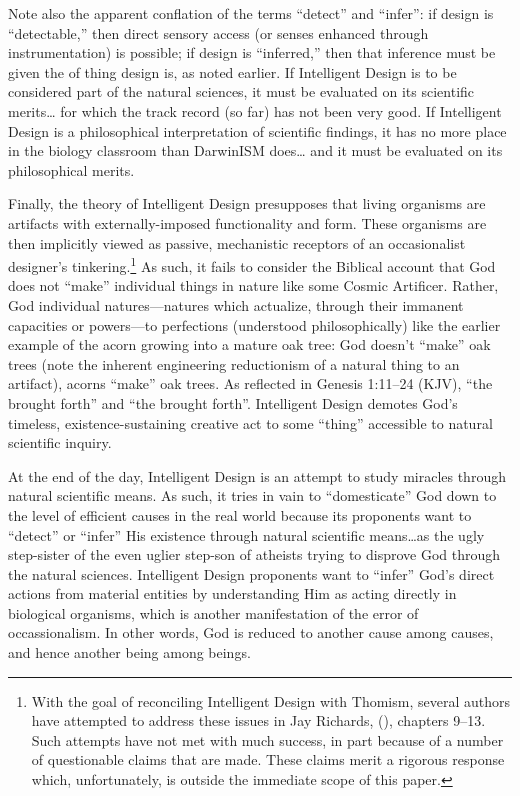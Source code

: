 Note also the apparent conflation of the terms ``detect'' and ``infer'': if design is ``detectable,'' then direct sensory access (or senses enhanced through instrumentation) is possible; if design is ``inferred,'' then that inference must be  given the  of thing design is, as noted earlier. If Intelligent Design is to be considered part of the natural sciences, it must be evaluated on its scientific merits\ldots{} for which the track record (so far) has not been very good. If Intelligent Design is a philosophical interpretation of scientific findings, it has no more place in the biology classroom than DarwinISM does\ldots{} and it must be evaluated on its philosophical merits.

Finally, the theory of Intelligent Design presupposes that living organisms are artifacts with externally-imposed functionality and form. These organisms are then implicitly viewed as passive, mechanistic receptors of an occasionalist designer's tinkering.\footnote{With the goal of reconciling Intelligent Design with Thomism, several authors have attempted to address these issues in Jay Richards,  (\citeyear{richards2010}), chapters 9--13. Such attempts have not met with much success, in part because of a number of questionable claims that are made. These claims merit a rigorous response which, unfortunately, is outside the immediate scope of this paper.} 
As such, it fails to consider the Biblical account that God does not ``make'' individual things in nature like some Cosmic Artificer. Rather, God  individual natures---natures which actualize, through their immanent capacities or powers---to perfections (understood philosophically) like the earlier example of the acorn growing into a mature oak tree: God doesn't ``make'' oak trees (note the inherent engineering reductionism of a natural thing to an artifact), acorns ``make'' oak trees. As reflected in Genesis 1:11--24 (KJV), ``the  brought forth'' and ``the  brought forth''. Intelligent Design demotes God's timeless, existence-sustaining creative act to some ``thing'' accessible to natural scientific inquiry.

At the end of the day, Intelligent Design is an attempt to study miracles through natural scientific means. As such, it tries in vain to ``domesticate'' God down to the level of efficient causes in the real world because its proponents want to ``detect'' or ``infer'' His existence  through natural scientific means\ldots as the ugly step-sister of the even uglier step-son of atheists trying to disprove God through the natural sciences. Intelligent Design proponents want to ``infer'' God's direct actions from material entities by understanding Him as acting directly in biological organisms, which is another manifestation of the error of occassionalism.  In other words, God is reduced to another cause among causes, and hence another being among beings.

